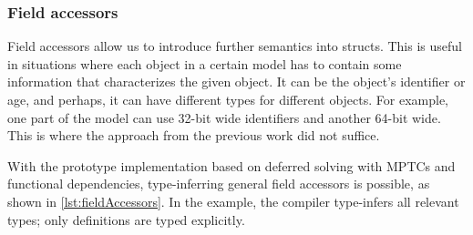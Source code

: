 \subsubsection{Field accessors}

Field accessors allow us to introduce further semantics into structs. This is useful in situations where each object in a certain model has to contain some information that characterizes the given object. It can be the object's identifier or age, and perhaps, it can have different types for different objects. For example, one part of the model can use 32-bit wide identifiers and another 64-bit wide. This is where the approach from the previous work did not suffice.

With the prototype implementation based on deferred solving with MPTCs and functional dependencies, type-inferring general field accessors is possible, as shown in \cref{lst:fieldAccessors}. In the example, the compiler type-infers all relevant types; only  definitions are typed explicitly.

